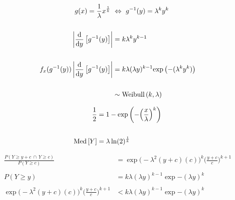 \documentclass[12pt]{article}
\begin{document}

\begin{enumerate}


\begin{align*}
    g(x) = \frac{1}{\lambda} x^{\frac{1}{k}} ~&\Leftrightarrow~ g^{-1}(y) = \lambda^ky^k \\ \\ 
    \left|\dfrac{\text{d}}{\text{d} y}\left[g^{-1}(y)\right]\right| &= k\lambda^ky^{k-1} \\ \\ 
    f_x(g^{-1}(y)) \left|\dfrac{\text{d}}{\text{d} y}\left[g^{-1}(y)\right]\right| &= k\lambda (\lambda y)^{k-1}\mathrm{exp}\left(-(\lambda^ky^k)\right) \\ \\ 
    &\sim  \text{Weibull}\left(k,\lambda\right)
\end{align*}


\begin{align*}
    \frac{1}{2} &= 1 - \mathrm{exp}\left(-\Big(\frac{x}{\lambda}\Big)^k\right) \\ \\ 
    \text{Med}\left[Y\right] &= \lambda\ln(2)^{\frac{1}{k}} 
\end{align*}



\begin{align*}
    \frac{P(Y \geq y + c ~\cap~ Y \geq c )}{P(Y \geq c)} &= \exp{\Big(-\lambda^2(y+c)(c)\Big)^k} \Big(\frac{y+c}{c}\Big)^{k+1} \\ \\ 
    P(Y \geq y) &= k\lambda (\lambda y)^{k-1}\exp{-(\lambda y)^k} \\ \\ 
    \exp{\Big(-\lambda^2(y+c)(c)\Big)^k} \Big(\frac{y+c}{c}\Big)^{k+1} &< k\lambda (\lambda y)^{k-1}\exp{-(\lambda y)^k}
\end{align*}


\end{enumerate}
\end{document}
